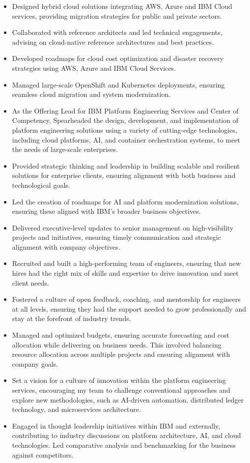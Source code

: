 \documentclass[12pt,]{scrartcl}
\begin{document}
\begin{itemize}
    \item Designed hybrid cloud solutions integrating AWS, Azure and IBM Cloud services, providing migration strategies for public and private sectors.
    \item Collaborated with reference architects and led technical engagements, advising on cloud-native reference architectures and best practices.
    \item Developed roadmaps for cloud cost optimization and disaster recovery strategies using AWS, Azure and IBM Cloud Services.
    \item Managed large-scale OpenShift and Kubernetes deployments, ensuring seamless cloud migration and system modernization.
    \item As the Offering Lead for IBM Platform Engineering Services and Center of Competency, Spearheaded the design, development, and implementation of platform engineering solutions using a variety of cutting-edge technologies, including cloud platforms, AI, and container orchestration systems, to meet the needs of large-scale enterprises.
    \item Provided strategic thinking and leadership in building scalable and resilient solutions for enterprise clients, ensuring alignment with both business and technological goals.
    \item Led the creation of roadmaps for AI and platform modernization solutions, ensuring these aligned with IBM's broader business objectives.
    \item Delivered executive-level updates to senior management on high-visibility projects and initiatives, ensuring timely communication and strategic alignment with company objectives.
    \item Recruited and built a high-performing team of engineers, ensuring that new hires had the right mix of skills and expertise to drive innovation and meet client needs.
    \item Fostered a culture of open feedback, coaching, and mentorship for engineers at all levels, ensuring they had the support needed to grow professionally and stay at the forefront of industry trends.
    \item Managed and optimized budgets, ensuring accurate forecasting and cost allocation while delivering on business needs. This involved balancing resource allocation across multiple projects and ensuring alignment with company goals.
    \item Set a vision for a culture of innovation within the platform engineering services, encouraging my team to challenge conventional approaches and explore new methodologies, such as AI-driven automation, distributed ledger technology, and microservices architecture.
    \item Engaged in thought leadership initiatives within IBM and externally, contributing to industry discussions on platform architecture, AI, and cloud technologies. Led comparative analysis and benchmarking for the business against competitors.
\end{itemize}
\end{document}
